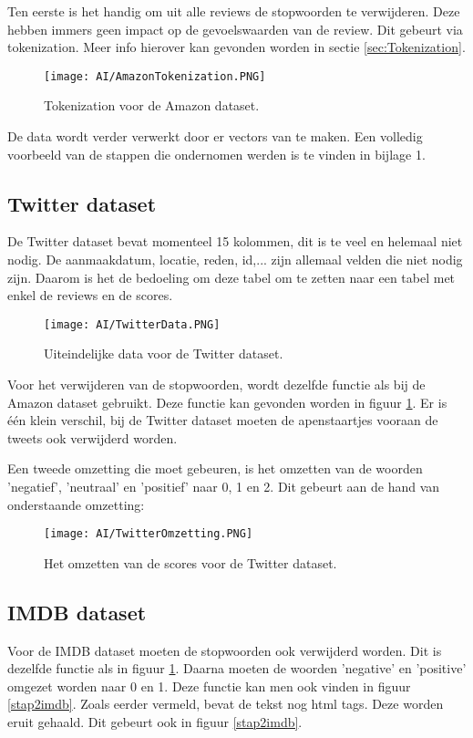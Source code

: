 Ten eerste is het handig om uit alle reviews de stopwoorden te verwijderen. Deze hebben immers geen impact op de gevoelswaarden van de review. Dit gebeurt via \gls{tokenization}. Meer info hierover kan gevonden worden in sectie \ref{sec:Tokenization}.

\begin{figure}[!htbp]
    \texttt{[image: AI/AmazonTokenization.PNG]}
    \caption{\label{amazontokenization}Tokenization voor de Amazon dataset.}
\end{figure}
\FloatBarrier

De data wordt verder verwerkt door er vectors van te maken. Een volledig voorbeeld van de stappen die ondernomen werden is te vinden in bijlage 1.

\subsection{Twitter dataset} 
De Twitter dataset bevat momenteel 15 kolommen, dit is te veel en helemaal niet nodig. De aanmaakdatum, locatie, reden, id,... zijn allemaal velden die niet nodig zijn. Daarom is het de bedoeling om deze tabel om te zetten naar een tabel met enkel de reviews en de scores. 


\begin{figure}[!htbp]
    \texttt{[image: AI/TwitterData.PNG]}
    \caption{\label{twitterdata}Uiteindelijke data voor de Twitter dataset.}
\end{figure}
\FloatBarrier

Voor het verwijderen van de stopwoorden, wordt dezelfde functie als bij de Amazon dataset gebruikt. Deze functie kan gevonden worden in figuur \ref{amazontokenization}. Er is één klein verschil, bij de Twitter dataset moeten de apenstaartjes vooraan de tweets ook verwijderd worden. 

Een tweede omzetting die moet gebeuren, is het omzetten van de woorden 'negatief', 'neutraal' en 'positief' naar 0, 1 en 2. Dit gebeurt aan de hand van onderstaande omzetting:

\begin{figure}[!htbp]
    \texttt{[image: AI/TwitterOmzetting.PNG]}
    \caption{\label{twitteromzetting}Het omzetten van de scores voor de Twitter dataset.}
\end{figure}
\FloatBarrier

\subsection{IMDB dataset}
Voor de IMDB dataset moeten de stopwoorden ook verwijderd worden. Dit is dezelfde functie als in figuur \ref{amazontokenization}. Daarna moeten de woorden 'negative' en 'positive' omgezet worden naar 0 en 1. Deze functie kan men ook vinden in figuur \ref{stap2imdb}. Zoals eerder vermeld, bevat de tekst nog html tags. Deze worden eruit gehaald. Dit gebeurt ook in figuur \ref{stap2imdb}.


